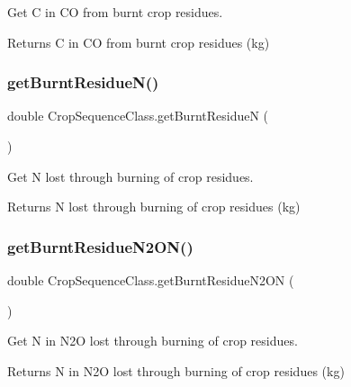 Get C in CO from burnt crop residues. 

\begin{DoxyReturn}{Returns}
C in CO from burnt crop residues (kg) 
\end{DoxyReturn}
\mbox{\label{class_crop_sequence_class_a2c887c3ec30b6911a3444db4d9b116e2}} 
\subsubsection{\texorpdfstring{getBurntResidueN()}{getBurntResidueN()}}
{\footnotesize\ttfamily double Crop\+Sequence\+Class.\+get\+Burnt\+ResidueN (\begin{DoxyParamCaption}{ }\end{DoxyParamCaption})\hspace{0.3cm}{\ttfamily [inline]}}



Get N lost through burning of crop residues. 

\begin{DoxyReturn}{Returns}
N lost through burning of crop residues (kg) 
\end{DoxyReturn}
\mbox{\label{class_crop_sequence_class_ad20b3689a946352cf147d57e2c22d069}} 
\subsubsection{\texorpdfstring{getBurntResidueN2ON()}{getBurntResidueN2ON()}}
{\footnotesize\ttfamily double Crop\+Sequence\+Class.\+get\+Burnt\+Residue\+N2\+ON (\begin{DoxyParamCaption}{ }\end{DoxyParamCaption})\hspace{0.3cm}{\ttfamily [inline]}}



Get N in N2O lost through burning of crop residues. 

\begin{DoxyReturn}{Returns}
N in N2O lost through burning of crop residues (kg) 
\end{DoxyReturn}
\mbox{\label{class_crop_sequence_class_abd4a4514e94f542705fa48565901094b}} 
